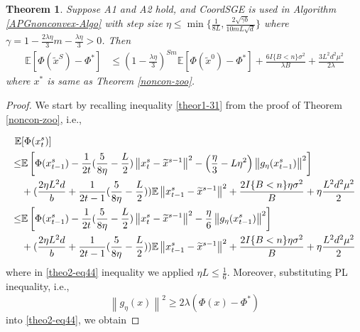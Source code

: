 \documentclass{article}
\newcommand*{\E}{\mathbb{E}}
\newcommand{\norm}[1]{\left\lVert#1\right\rVert}
\newtheorem{theorem}{Theorem}[section]
\theoremstyle{definition}
\theoremstyle{remark}
\begin{document}
\begin{theorem}\label{PL-Zoo}
Suppose  A1  and  A2  hold, and  CoordSGE  is  used  in
 Algorithm \ref{APGnonconvex-Algo} with step size $\eta \leq \min\{\frac{1}{8L}, \frac{2\sqrt{\gamma b}}{10 m L \sqrt{d}}\}$ where $\gamma = 1-\frac{2\lambda\eta}{3} m-\frac{\lambda\eta}{3} > 0$. Then 
\begin{equation}
\begin{split}
\E[\Phi(\widetilde{x}^S) - {\Phi}^*] & \leq   \left(1-\frac{\lambda\eta}{3}\right)^{Sm} \E[\Phi(\widetilde{x}^0) - {\Phi}^*] + \frac{6I\{B < n\} \sigma ^2}{\lambda B}+\frac{3 L^2 d^2 \mu^2}{2\lambda}
\end{split}
\end{equation}
where $x^*$ is same as Theorem \ref{noncon-zoo}.
\end{theorem}
\begin{proof}
We start by recalling inequality \eqref{theor1-31} from the proof of Theorem \ref{noncon-zoo}, i.e.,

{\color{Brown}
\begin{align} 
\E&[\Phi({x}_{t}^s)] \notag
\\ \leq& \E\left[\Phi({x}_{t-1}^s)  -\frac{1}{2t}(\frac{5}{8\eta} - \frac{L}{2})\norm{{x}_t^s-\widetilde{x}^{s-1}}^2- \left(\frac{\eta}{3}-L\eta^2\right)\norm{g_{\eta}(x_{t-1}^s)}^2\right]\notag\\
&+(\frac{2\eta L^2 d}{b}+\frac{1}{2t-1}(\frac{5}{8\eta} - \frac{L}{2}))\E\norm{x_{t-1}^s-\widetilde{x}^{s-1}}^2
+ \frac{2I\{B < n\}\eta \sigma ^2}{B}+\eta \frac{L^2 d^2 \mu^2}{2}\notag
\\ \leq& \E\left[\Phi({x}_{t-1}^s)  -\frac{1}{2t}(\frac{5}{8\eta} - \frac{L}{2})\norm{{x}_t^s-\widetilde{x}^{s-1}}^2- \frac{\eta}{6}\norm{g_{\eta}(x_{t-1}^s)}^2\right]\notag\\
&+(\frac{2\eta L^2 d}{b}+\frac{1}{2t-1}(\frac{5}{8\eta} - \frac{L}{2}))\E\norm{x_{t-1}^s-\widetilde{x}^{s-1}}^2
+ \frac{2I\{B < n\}\eta \sigma ^2}{B}+\eta \frac{L^2 d^2 \mu^2}{2}\label{theo2-eq44}
 \end{align}
 where in \eqref{theo2-eq44} inequality we applied $\eta L \leq \frac{1}{6}$.
 }
Moreover, substituting PL inequality, i.e., 
\begin{equation}
\norm{g_{\eta}(x)}^2 \geq 2\lambda (\Phi(x) - \Phi^*)
\end{equation}
into \eqref{theo2-eq44}, we obtain


\end{proof}
\end{document}
